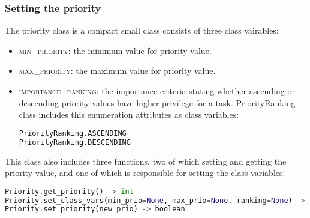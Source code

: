 \documentclass[]{scrartcl}
\begin{document}
            
\subsubsection{Setting the priority}
The priority class is a compact small class consists of three class vairables:
\begin{itemize}
    \item \textsc{min\_priority}: the minimum value for priority value.
    \item \textsc{max\_priority}: the maximum value for priority value.
    \item \textsc{importance\_ranking}: the importance criteria stating whether ascending or descending priority values have higher privilege for a task. \textsf{PriorityRanking} class includes this enumeration attributes
    as class variables:
    
\begin{lstlisting}[language=Python, frame=single, label={lst:t1PriorityRanking}, caption={The \textsf{PriorityRanking} enumeration.}]
PriorityRanking.ASCENDING
PriorityRanking.DESCENDING
\end{lstlisting}
        
\end{itemize}
        
This class also includes three functions, two of which setting and getting the priority value, and one of which is responsible for setting the class variables:

\begin{lstlisting}[language=Python, frame=single, label={lst:t1memberFunctionsPriority}, caption={The member functions for \textsf{Priority} module.}]
Priority.get_priority() -> int
Priority.set_class_vars(min_prio=None, max_prio=None, ranking=None) -> None (class method)
Priority.set_priority(new_prio) -> boolean
\end{lstlisting}
        
        
\end{document}
